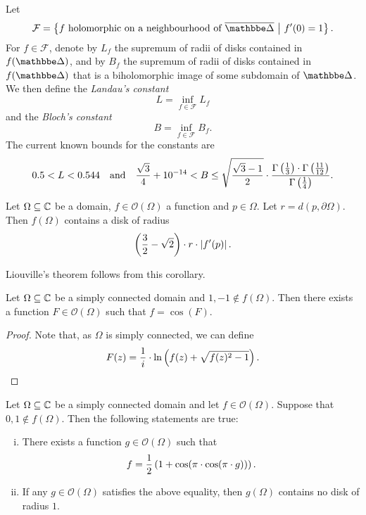 \begin{opomba}
Let
\[
\mathcal{F} =
\setb{\text{$f$ holomorphic on a neighbourhood of $\oline{\dsk}$}}
{f'(0) = 1}.
\]
For $f \in \mathcal{F}$, denote by $L_f$ the supremum of radii of
disks contained in $f(\dsk)$, and by $B_f$ the supremum of radii of
disks contained in $f(\dsk)$ that is a biholomorphic image of some
subdomain of $\dsk$. We then define the \emph{Landau's constant}
\[
L = \inf_{f \in \mathcal{F}} L_f
\]
and the \emph{Bloch's constant}
\[
B = \inf_{f \in \mathcal{F}} B_f.
\]
The current known bounds for the constants are
\[
0.5 < L < 0.544
\quad \text{and} \quad
\frac{\sqrt{3}}{4} + 10^{-14} < B \leq
\sqrt{\frac{\sqrt{3} - 1}{2}} \cdot
\frac{\Gamma \left(\frac{1}{3}\right) \cdot \Gamma \left(\frac{11}{12}\right)}
{\Gamma \left(\frac{1}{4}\right)}.
\]
\end{opomba}

\begin{posledica}
\label{thm_hol:cor:bloch}
Let $\Omega \subseteq \mathbb{C}$ be a domain, $f \in \mathcal{O}(\Omega)$
a function and $p \in \Omega$. Let $r = d(p, \partial \Omega)$.
Then $f(\Omega)$ contains a disk of radius
\[
\left(\frac{3}{2} - \sqrt{2}\right) \cdot r \cdot \left\lvert f'(p)\right\rvert.
\]
\end{posledica}

\obvs

\begin{opomba}
Liouville's theorem follows from this corollary.
\end{opomba}

\begin{lema}\label{thm_hol:lm:arcos}
Let $\Omega \subseteq \mathbb{C}$ be a simply connected domain and
$1, -1 \not \in f(\Omega)$. Then there exists a function
$F \in \mathcal{O}(\Omega)$ such that $f = \cos(F)$.
\end{lema}

\begin{proof}
Note that, as $\Omega$ is simply connected, we can define
\[
F(z) =
\frac{1}{i} \cdot \ln \left(f(z) + \sqrt{f(z)^2-1}\right). \qedhere
\]
\end{proof}

\begin{izrek}
Let $\Omega \subseteq \mathbb{C}$ be a simply connected domain and let
$f \in \mathcal{O}(\Omega)$. Suppose that
$0, 1 \not \in f(\Omega)$. Then the following statements are true:

\begin{enumerate}[i)]
\item There exists a function $g \in \mathcal{O}(\Omega)$ such that
\[
f = \frac{1}{2} \left(1 + \cos(\pi \cdot \cos(\pi \cdot g))\right).
\]
\item If any $g \in \mathcal{O}(\Omega)$ satisfies the above
equality, then $g(\Omega)$ contains no disk of radius $1$.
\end{enumerate}
\end{izrek}

